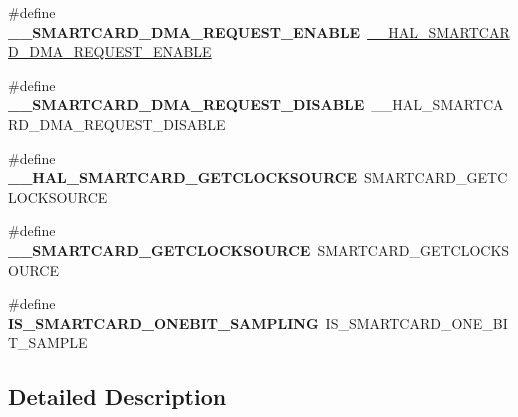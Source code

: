 \begin{DoxyCompactItemize}
\item 
\#define {\bfseries \+\_\+\+\_\+\+S\+M\+A\+R\+T\+C\+A\+R\+D\+\_\+\+D\+M\+A\+\_\+\+R\+E\+Q\+U\+E\+S\+T\+\_\+\+E\+N\+A\+B\+LE}~\hyperlink{group___s_m_a_r_t_c_a_r_d___exported___macros_gad804640be44ae81aa60fe888bb9aa187}{\+\_\+\+\_\+\+H\+A\+L\+\_\+\+S\+M\+A\+R\+T\+C\+A\+R\+D\+\_\+\+D\+M\+A\+\_\+\+R\+E\+Q\+U\+E\+S\+T\+\_\+\+E\+N\+A\+B\+LE}\hypertarget{group___h_a_l___s_m_a_r_t_c_a_r_d___aliased___macros_ga758ec49e911579f65f7cb03e11cbf1b7}{}\label{group___h_a_l___s_m_a_r_t_c_a_r_d___aliased___macros_ga758ec49e911579f65f7cb03e11cbf1b7}

\item 
\#define {\bfseries \+\_\+\+\_\+\+S\+M\+A\+R\+T\+C\+A\+R\+D\+\_\+\+D\+M\+A\+\_\+\+R\+E\+Q\+U\+E\+S\+T\+\_\+\+D\+I\+S\+A\+B\+LE}~\+\_\+\+\_\+\+H\+A\+L\+\_\+\+S\+M\+A\+R\+T\+C\+A\+R\+D\+\_\+\+D\+M\+A\+\_\+\+R\+E\+Q\+U\+E\+S\+T\+\_\+\+D\+I\+S\+A\+B\+LE\hypertarget{group___h_a_l___s_m_a_r_t_c_a_r_d___aliased___macros_gac7fcc6baa98b300ea02656c79c48b2a9}{}\label{group___h_a_l___s_m_a_r_t_c_a_r_d___aliased___macros_gac7fcc6baa98b300ea02656c79c48b2a9}

\item 
\#define {\bfseries \+\_\+\+\_\+\+H\+A\+L\+\_\+\+S\+M\+A\+R\+T\+C\+A\+R\+D\+\_\+\+G\+E\+T\+C\+L\+O\+C\+K\+S\+O\+U\+R\+CE}~S\+M\+A\+R\+T\+C\+A\+R\+D\+\_\+\+G\+E\+T\+C\+L\+O\+C\+K\+S\+O\+U\+R\+CE\hypertarget{group___h_a_l___s_m_a_r_t_c_a_r_d___aliased___macros_ga94815bec2412334dadbc50408ff955f2}{}\label{group___h_a_l___s_m_a_r_t_c_a_r_d___aliased___macros_ga94815bec2412334dadbc50408ff955f2}

\item 
\#define {\bfseries \+\_\+\+\_\+\+S\+M\+A\+R\+T\+C\+A\+R\+D\+\_\+\+G\+E\+T\+C\+L\+O\+C\+K\+S\+O\+U\+R\+CE}~S\+M\+A\+R\+T\+C\+A\+R\+D\+\_\+\+G\+E\+T\+C\+L\+O\+C\+K\+S\+O\+U\+R\+CE\hypertarget{group___h_a_l___s_m_a_r_t_c_a_r_d___aliased___macros_gaba3d4f1525efcda959a2a468889af9d6}{}\label{group___h_a_l___s_m_a_r_t_c_a_r_d___aliased___macros_gaba3d4f1525efcda959a2a468889af9d6}

\item 
\#define {\bfseries I\+S\+\_\+\+S\+M\+A\+R\+T\+C\+A\+R\+D\+\_\+\+O\+N\+E\+B\+I\+T\+\_\+\+S\+A\+M\+P\+L\+I\+NG}~I\+S\+\_\+\+S\+M\+A\+R\+T\+C\+A\+R\+D\+\_\+\+O\+N\+E\+\_\+\+B\+I\+T\+\_\+\+S\+A\+M\+P\+LE\hypertarget{group___h_a_l___s_m_a_r_t_c_a_r_d___aliased___macros_ga02c2a746784a8186a7a1fbbe452670d3}{}\label{group___h_a_l___s_m_a_r_t_c_a_r_d___aliased___macros_ga02c2a746784a8186a7a1fbbe452670d3}

\end{DoxyCompactItemize}


\subsection{Detailed Description}
